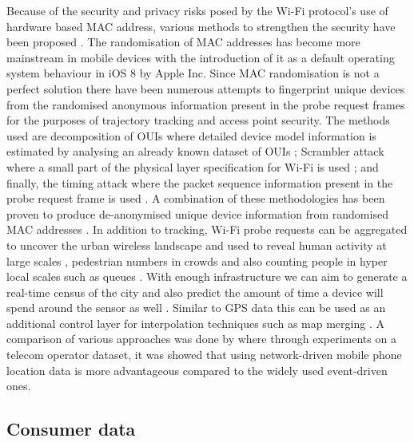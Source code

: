 Because of the security and privacy risks posed by the Wi-Fi protocol’s use of hardware based MAC address, various methods to strengthen the security have been proposed \citep{pang2007, greenstein2008}.
The randomisation of MAC addresses has become more mainstream in mobile devices with the introduction of it as a default operating system behaviour in iOS 8 by Apple Inc.
Since MAC randomisation is not a perfect solution \citep{mathieucunche2016} there have been numerous attempts to fingerprint unique devices from the randomised anonymous information present in the probe request frames for the purposes of trajectory tracking and access point security.
The methods used are decomposition of OUIs where detailed device model information is estimated by analysing an already known dataset of OUIs \citep{martin2016}; Scrambler attack where a small part of the physical layer specification for Wi-Fi is used \citep{bloessl2015}; and finally, the timing attack where the packet sequence information present in the probe request frame is used \citep{matte2016, cheng2016}.
A combination of these methodologies has been proven to produce de-anonymised unique device information from randomised MAC addresses \citep{vanhoef2016}.
In addition to tracking, Wi-Fi probe requests can be aggregated to uncover the urban wireless landscape \citep{rose2010} and used to reveal human activity at large scales \citep{qin2013}, pedestrian numbers in crowds \citep{schauer2014, fukuzaki2015} and also counting people in hyper local scales such as queues \citep{wang2013}.
With enough infrastructure we can aim to generate a real-time census of the city \citep{kontokosta2016} and also predict the amount of time a device will spend around the sensor as well \citep{manweiler2013}.
Similar to GPS data this can be used as an additional control layer for interpolation techniques such as map merging \citep{erinc2013}.
A comparison of various approaches was done by \cite[-3cm]{pinelli2015} where through experiments on a telecom operator dataset, it was showed that using network-driven mobile phone location data is more advantageous compared to the widely used event-driven ones.

\subsection{Consumer data}

